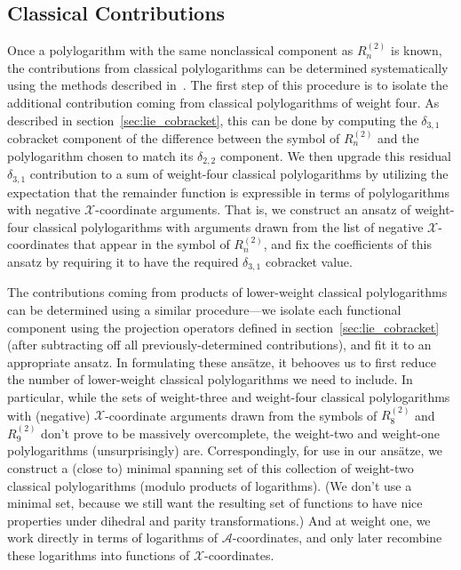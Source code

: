 \documentclass[11pt]{article}
\def\x{\mathcal{X}}
\def\a{\mathcal{A}}
\begin{document}

\subsection{Classical Contributions}

Once a polylogarithm with the same nonclassical component as $R_n^{(2)}$\! is known, the contributions from classical polylogarithms can be determined systematically using the methods described in~\cite{Goncharov:2010jf,Golden:2014xqf}. The first step of this procedure is to isolate the additional contribution coming from classical polylogarithms of weight four. As described in section~\ref{sec:lie_cobracket}, this can be done by computing the $\delta_{3,1}$ cobracket component of the difference between the symbol of $R_n^{(2)}$\! and the polylogarithm chosen to match its $\delta_{2,2}$ component. We then upgrade this residual $\delta_{3,1}$ contribution to a sum of weight-four classical polylogarithms by utilizing the expectation that the remainder function is expressible in terms of polylogarithms with negative $\x$-coordinate arguments. That is, we construct an ansatz of weight-four classical polylogarithms with arguments drawn from the list of negative $\x$-coordinates that appear in the symbol of $R_n^{(2)}$\!, and fix the coefficients of this ansatz by requiring it to have the required $\delta_{3,1}$ cobracket value.

The contributions coming from products of lower-weight classical polylogarithms can be determined using a similar procedure---we isolate each functional component using the projection operators defined in section~\ref{sec:lie_cobracket} (after subtracting off all previously-determined contributions), and fit it to an appropriate ansatz. In formulating these ans\"atze, it behooves us to first reduce the number of lower-weight classical polylogarithms we need to include. In particular, while the sets of weight-three and weight-four classical polylogarithms with (negative) $\x$-coordinate arguments drawn from the symbols of $R_8^{(2)}$\! and $R_9^{(2)}$\! don't prove to be massively overcomplete, the weight-two and weight-one polylogarithms (unsurprisingly) are. Correspondingly, for use in our ans\"atze, we construct a (close to) minimal spanning set of this collection of weight-two classical polylogarithms (modulo products of logarithms). (We don't use a minimal set, because we still want the resulting set of functions to have nice properties under dihedral and parity transformations.) And at weight one, we work directly in terms of logarithms of $\a$-coordinates, and only later recombine these logarithms into functions of $\x$-coordinates.  
\end{document}
